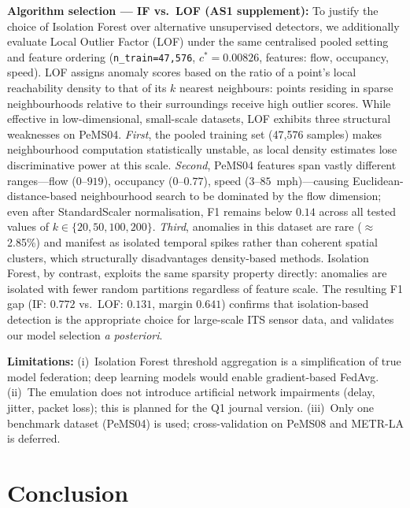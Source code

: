 \documentclass[conference]{IEEEtran}
\begin{document}
\textbf{Algorithm selection --- IF vs.\ LOF (AS1 supplement):}
To justify the choice of Isolation Forest over alternative unsupervised
detectors, we additionally evaluate Local Outlier Factor (LOF)
\cite{breunig2000lof} under the same centralised pooled setting and
feature ordering (\texttt{n\_train=47,576}, $c^*=0.00826$,
features: flow, occupancy, speed).
LOF assigns anomaly scores based on the ratio of a point's local
reachability density to that of its $k$ nearest neighbours: points
residing in sparse neighbourhoods relative to their surroundings
receive high outlier scores.
While effective in low-dimensional, small-scale datasets, LOF exhibits
three structural weaknesses on PeMS04.
\textit{First}, the pooled training set (47,576 samples) makes
neighbourhood computation statistically unstable, as local density
estimates lose discriminative power at this scale.
\textit{Second}, PeMS04 features span vastly different ranges---flow
($0$--$919$), occupancy ($0$--$0.77$), speed ($3$--$85$~mph)---causing
Euclidean-distance-based neighbourhood search to be dominated by the
flow dimension; even after StandardScaler normalisation, F1 remains
below $0.14$ across all tested values of $k \in \{20,50,100,200\}$.
\textit{Third}, anomalies in this dataset are rare ($\approx$2.85\%)
and manifest as isolated temporal spikes rather than coherent spatial
clusters, which structurally disadvantages density-based methods.
Isolation Forest, by contrast, exploits the same sparsity property
directly: anomalies are isolated with fewer random partitions
regardless of feature scale.
The resulting F1 gap (IF: $0.772$ vs.\ LOF: $0.131$, margin $0.641$)
confirms that isolation-based detection is the appropriate choice for
large-scale ITS sensor data, and validates our model selection
\textit{a posteriori}.

\textbf{Limitations:}
(i)~Isolation Forest threshold aggregation is a simplification of true
model federation; deep learning models would enable gradient-based
FedAvg.
(ii)~The emulation does not introduce artificial network impairments
(delay, jitter, packet loss); this is planned for the Q1 journal version.
(iii)~Only one benchmark dataset (PeMS04) is used; cross-validation on
PeMS08 and METR-LA is deferred.

\section{Conclusion}
\end{document}
